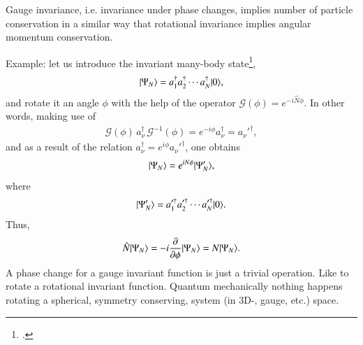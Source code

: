  Gauge invariance, i.e. invariance under phase changes, implies number of particle conservation in a similar way that rotational invariance implies angular momentum conservation.

Example: let us introduce the  invariant many-body state\footnote{\cite{Anderson:64b}.},
\begin{align}\label{eq3.7.12}
|{\Psi_N} \rangle=a_1^\dagger a_2^\dagger\dotsb a_N^\dagger |{0} \rangle,
\end{align}
and rotate it an angle $\phi$ with the help of the operator $\mathcal G(\phi)=e^{-i\hat N\phi}$. In other words, making use of
\begin{align}\label{eq3.7.15}
\mathcal G(\phi)\,a_\nu^\dagger\, \mathcal G^{-1}(\phi)=e^{-i\phi}a_\nu^\dagger=a_\nu'^\dagger,
\end{align}
and as a result of the relation $a_\nu^\dagger=e^{i\phi}a_\nu'^\dagger$, one obtains
\begin{align}\label{eq3.7.13}
|{\Psi_N} \rangle=e^{iN\phi}|{\Psi'_N} \rangle,
\end{align}
where
\begin{align}\label{eq3.7.14}
|{\Psi'_N} \rangle=a_1'^\dagger a_2'^\dagger\dotsb a_N'^\dagger|{0} \rangle.
\end{align}
Thus,
\begin{align}\label{eq3.7.17}
\hat N|{\Psi_N} \rangle=-i\frac{\partial}{\partial \phi}|{\Psi_N} \rangle=N|{\Psi_N} \rangle.
\end{align}
 A phase change for a gauge invariant function is just a trivial operation. Like to rotate a rotational invariant function. Quantum mechanically nothing happens rotating a spherical, symmetry conserving, system (in 3D-, gauge, etc.) space.


